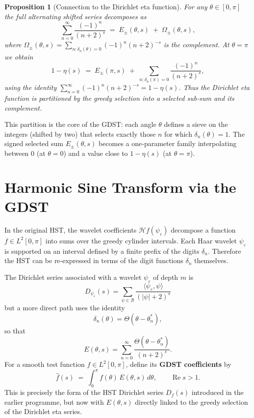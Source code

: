 \documentclass[11pt,a4paper]{article}
\newtheorem{proposition}[definition]{Proposition}
\begin{document}
\begin{proposition}[Connection to the Dirichlet eta function]\label{prop:eta}
For any \(\theta\in[0,\pi]\) the full alternating shifted series decomposes as
\[
\sum_{n=0}^{\infty}\frac{(-1)^n}{(n+2)^s}
   \;=\; E_\pm(\theta,s) \;+\; \Omega_\pm(\theta,s),
\]
where \(\Omega_\pm(\theta,s)=\sum_{n:\delta_n(\theta)=0}(-1)^n(n+2)^{-s}\) is the complement.
At \(\theta=\pi\) we obtain
\[
1-\eta(s) \;=\; E_\pm(\pi,s) \;+\; \sum_{n:\delta_n(\pi)=0}\frac{(-1)^n}{(n+2)^s},
\]
using the identity \(\sum_{n=0}^\infty (-1)^n (n+2)^{-s}=1-\eta(s)\).
Thus the Dirichlet eta function is partitioned by the greedy selection into a selected sub‑sum and its complement.
\end{proposition}

This partition is the core of the GDST: each angle \(\theta\) defines a sieve on the integers (shifted by two) that selects exactly those \(n\) for which \(\delta_n(\theta)=1\).  The signed selected sum \(E_\pm(\theta,s)\) becomes a one‑parameter family interpolating between \(0\) (at \(\theta=0\)) and a value close to \(1-\eta(s)\) (at \(\theta=\pi\)).

\section{Harmonic Sine Transform via the GDST}
In the original HST, the wavelet coefficients \(\mathcal{H}f(\psi_\varepsilon)\) decompose a function \(f\in L^2[0,\pi]\) into sums over the greedy cylinder intervals.  Each Haar wavelet \(\psi_\varepsilon\) is supported on an interval defined by a finite prefix of the digits \(\delta_n\).  Therefore the HST can be re‑expressed in terms of the digit functions \(\delta_n\) themselves.

The Dirichlet series associated with a wavelet \(\psi_\varepsilon\) of depth \(m\) is
\[
D_{\psi_\varepsilon}(s) = \sum_{\psi\in\mathcal{B}}\frac{\langle\psi_\varepsilon,\psi\rangle}{(|\psi|+2)^s}
\]
but a more direct path uses the identity
\[
\delta_n(\theta) = \Theta(\theta-\theta_n^*),
\]
so that
\[
E(\theta,s) = \sum_{n=0}^{\infty} \frac{\Theta(\theta-\theta_n^*)}{(n+2)^s}.
\]
For a smooth test function \(f\in L^2[0,\pi]\), define its \textbf{GDST coefficients} by
\[
\widehat{f}(s) \;=\; \int_0^\pi f(\theta)\, E(\theta,s)\, d\theta,\qquad \operatorname{Re}s>1.
\]
This is precisely the form of the HST Dirichlet series \(D_f(s)\) introduced in the earlier programme, but now with \(E(\theta,s)\) directly linked to the greedy selection of the Dirichlet eta series.
\end{document}
